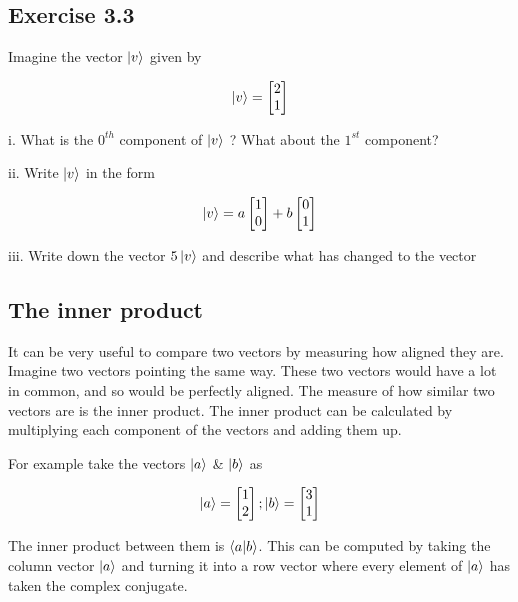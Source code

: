 \documentclass{book}
\begin{document}
\subsection{Exercise 3.3}

Imagine the vector $\ket{v}$ given by 

$$\ket{v} = \begin{bmatrix} 2 \\ 1 \end{bmatrix}$$

i. What is the $0^{th}$ component of $\ket{v}$ ? What about the $1^{st}$ component?

ii. Write $\ket{v}$ in the form 

$$
\ket{v} = a\begin{bmatrix} 1 \\ 0 \end{bmatrix} + b \begin{bmatrix} 0 \\ 1 \end{bmatrix}
$$

iii. Write down the vector $5\ket{v}$ and describe what has changed to the vector  


\subsection{The inner product}

It can be very useful to compare two vectors by measuring how aligned they are. Imagine two vectors pointing the same way. These two vectors would have a lot in common, and so would be perfectly aligned. The measure of how similar two vectors are is the inner product. The inner product can be calculated by multiplying each component of the vectors and adding them up. 

For example take the vectors $\ket{a}$ \& $\ket{b}$ as 

 $$
 \ket{a} = \begin{bmatrix} 1 \\ 2 \end{bmatrix} ;  \ket{b} = \begin{bmatrix} 3 \\ 1 \end{bmatrix} 
 $$

 The inner product between them is $\braket{a|b}$. This can be computed by taking the column vector $\ket{a}$ and turning it into a row vector where every element of $\ket{a}$ has taken the complex conjugate. 
\end{document}

